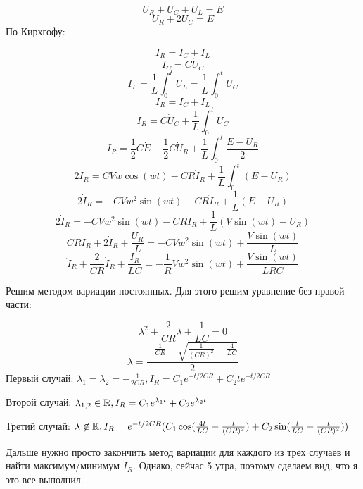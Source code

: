 \[U_R + U_C + U_L = E\]
\[U_R + 2U_C = E\]
По Кирхгофу:
\begin{center}
    
\end{center}
\[I_R = I_C + I_L\]
\[I_C = C\dot U_C\]
\[I_L = \frac{1}{L}\int_0^t U_L = \frac{1}{L}\int_0^t U_C\]
\[I_R = I_C + I_L\]
\[I_R = C\dot U_C + \frac{1}{L}\int_0^t U_C\]
\[I_R = \frac{1}{2}C\dot E - \frac{1}{2}C\dot U_R + \frac{1}{L}\int_0^t \frac{E - U_R}{2}\]
\[2I_R = CVw\cos (wt) - CR\dot I_R + \frac{1}{L}\int_0^t (E - U_R)\]
\[2\dot I_R = -CVw^2\sin (wt) - CR\ddot I_R + \frac{1}{L} (E - U_R)\]
\[2\dot I_R = -CVw^2\sin (wt) - CR\ddot I_R + \frac{1}{L} (V \sin(wt) - U_R)\]
\[CR\ddot I_R + 2\dot I_R + \frac{U_R}{L} = -CVw^2\sin (wt) + \frac{V \sin(wt)}{L}\]
\[\ddot I_R + \frac{2}{CR}\dot I_R + \frac{I_R}{LC} = -\frac{1}{R}Vw^2\sin (wt) + \frac{V \sin(wt)}{LRC}\]

Решим методом вариации постоянных. Для этого решим уравнение без правой части:

\[\lambda^2 + \frac{2}{CR} \lambda + \frac{1}{LC} = 0\]
\[\lambda = \frac{ - \frac{1}{CR} \pm \sqrt{\frac{1}{(CR)^2} - \frac{4}{LC}}}{2}\]
Первый случай: \(\lambda_1 = \lambda_2 = - \frac{1}{2CR}, I_R = C_1e^{ - t / 2CR} + C_2 t e^{ - t / 2CR}\)

Второй случай: \(\lambda_{1, 2}\in\mathbb{R}, I_R = C_1 e^{\lambda_1 t} + C_2e^{\lambda_2t}\)

Третий случай: \(\lambda\not\in\mathbb{R}, I_R = e^{ - t / 2CR}(C_1\cos(\frac{4t}{LC} - \frac{t}{(CR)^2}) + C_2\sin(\frac{t}{LC} - \frac{t}{(CR)^2}))\)

Дальше нужно просто закончить метод вариации для каждого из трех случаев и найти максимум/минимум \(I_R\). Однако, сейчас 5 утра, поэтому сделаем вид, что я это все выполнил.


